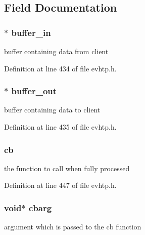 \subsection{Field Documentation}
\hypertarget{structevhtp__request__s_ad9e8b203574b6c44296b23b897206768}{
\subsubsection[{buffer\-\_\-in}]{$\ast$ buffer\-\_\-in}}\label{structevhtp__request__s_ad9e8b203574b6c44296b23b897206768}
buffer containing data from client 

Definition at line 434 of file evhtp.\-h.

\hypertarget{structevhtp__request__s_aa2a97cf41f1776b60c84e31eb6778d05}{
\subsubsection[{buffer\-\_\-out}]{$\ast$ buffer\-\_\-out}}\label{structevhtp__request__s_aa2a97cf41f1776b60c84e31eb6778d05}
buffer containing data to client 

Definition at line 435 of file evhtp.\-h.

\hypertarget{structevhtp__request__s_a783ee29046d4ff3e8c75f811e80fd57b}{
\subsubsection[{cb}]{ cb}}\label{structevhtp__request__s_a783ee29046d4ff3e8c75f811e80fd57b}
the function to call when fully processed 

Definition at line 447 of file evhtp.\-h.

\hypertarget{structevhtp__request__s_aafd3d1a6343925cb274875556a6faa0e}{
\subsubsection[{cbarg}]{\setlength{\rightskip}{0pt plus 5cm}void$\ast$ cbarg}}\label{structevhtp__request__s_aafd3d1a6343925cb274875556a6faa0e}
argument which is passed to the cb function 

